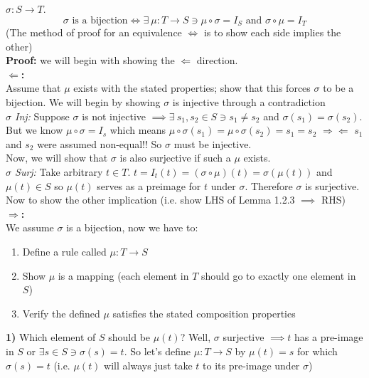\begin{lemma}
$\sigma :S \rightarrow T$.
\begin{equation}
    \sigma \text{ is a bijection} \iff \exists \ \mu: T\rightarrow S \ni \mu\circ \sigma = I_S \text{ and } \sigma\circ \mu = I_T\nonumber
\end{equation}
(The method of proof for an equivalence $\Leftrightarrow$ is to show each side implies the other)\steezybreak\\
\textbf{Proof:} we will begin with showing the $\Leftarrow$ direction.\\
\textbf{$\Leftarrow$:} \\Assume that $\mu$ exists with the stated properties; show that this forces $\sigma$ to be a bijection. We will begin by showing $\sigma$ is injective through a contradiction \steezybreak\\
\textit{$\sigma$ Inj:} Suppose $\sigma$ is not injective $\implies \exists \ s_1,s_2\in S \ni s_1\neq s_2$ and $\sigma(s_1)=\sigma(s_2)$. But we know $\mu \circ \sigma = I_s$ which means $\mu\circ \sigma (s_1) = \mu\circ \sigma(s_2) = s_1=s_2$ $\Rightarrow\Leftarrow$ $s_1$ and $s_2$ were assumed non-equal!! So $\sigma$ must be injective.\steezybreak\\
Now, we will show that $\sigma$ is also surjective if such a $\mu$ exists.\steezybreak\\
\textit{$\sigma$ Surj:} Take arbitrary $t\in T$. $t= I_t(t)= (\sigma\circ\mu)(t)=\sigma(\mu(t))$ and $\mu(t)\in S$ so $\mu(t)$ serves as a preimage for $t$ under $\sigma$. Therefore $\sigma$ is surjective. \\ 

\noindent Now to show the other implication (i.e. show LHS of Lemma 1.2.3 $\implies$ RHS) \\
\textbf{$\Rightarrow$:} \\ We assume $\sigma$ is a bijection, now we have to:
\begin{enumerate}
    \item Define a rule called $\mu:T\rightarrow S$
    \item Show $\mu$ is a mapping (each element in $T$ should go to exactly one element in $S$)
    \item Verify the defined $\mu$ satisfies the stated composition properties
\end{enumerate}
\textbf{1)} Which element of $S$ should be $\mu(t)$? Well, $\sigma$ surjective $\implies t$ has a pre-image in $S$ or $\exists s\in S \ni \sigma(s)=t$. So let's define $ \mu: T\rightarrow S$ by $\mu(t)=s$ for which $\sigma(s)=t$ (i.e. $\mu(t)$ will always just take $t$ to its pre-image under $\sigma$)\steezybreak\\


\end{lemma}
